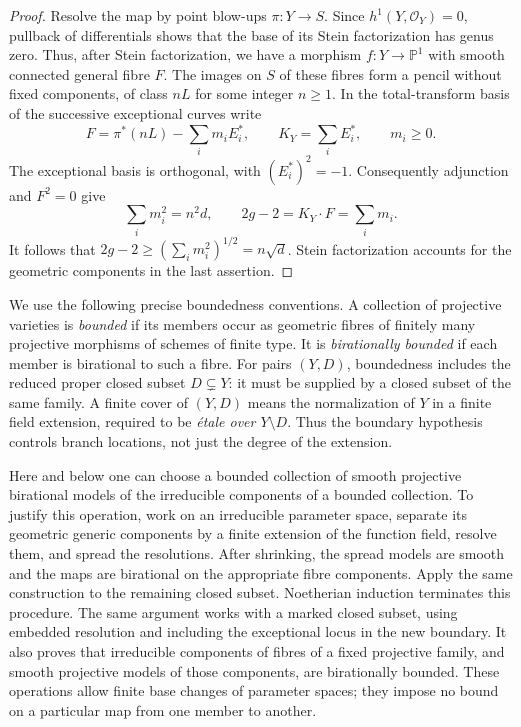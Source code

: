\begin{proof}
Resolve the map by point blow-ups $\pi:Y\to S$.  Since $h^1(Y,\mathcal
O_Y)=0$, pullback of differentials shows that the base of its Stein
factorization has genus zero.  Thus, after Stein factorization, we have
a morphism $f:Y\to\mathbb P^1$ with smooth connected general fibre $F$.
The images on $S$ of these fibres form a pencil without fixed components,
of class $nL$ for some integer $n\geq1$.  In the total-transform basis of
the successive exceptional curves write
\[
 F=\pi^*(nL)-\sum_i m_iE_i^*,\qquad
 K_Y=\sum_iE_i^*,\qquad m_i\geq0.
\]
The exceptional basis is orthogonal, with $(E_i^*)^2=-1$.  Consequently
adjunction and $F^2=0$ give
\[
       \sum_i m_i^2=n^2d,\qquad 2g-2=K_Y\cdot F=\sum_i m_i.
\]
It follows that $2g-2\geq(\sum_i m_i^2)^{1/2}=n\sqrt d$.
Stein factorization accounts for the geometric components in the last
assertion.
\end{proof}

We use the following precise boundedness conventions.  A collection of
projective varieties is \emph{bounded} if its members occur as geometric
fibres of finitely many projective morphisms of schemes of finite type.
It is \emph{birationally bounded} if each member is birational to such a
fibre.  For pairs $(Y,D)$, boundedness includes the reduced proper closed
subset $D\subsetneq Y$: it must be supplied by a closed subset of the
same family.  A finite cover of $(Y,D)$ means the normalization of $Y$
in a finite field extension, required to be \emph{\'etale over $Y\setminus
D$}.  Thus the boundary hypothesis controls branch locations, not just
the degree of the extension.

Here and below one can choose a bounded collection of smooth
projective birational models of the irreducible components of a bounded
collection.  To justify this
operation, work on an irreducible parameter space, separate its geometric
generic components by a finite extension of the function field, resolve
them, and spread the resolutions.  After shrinking, the spread models
are smooth and the maps are birational on the appropriate fibre
components.  Apply the same construction to the remaining closed subset.
Noetherian induction terminates this procedure.  The same argument works
with a marked closed subset, using embedded resolution and including the
exceptional locus in the new boundary.  It also proves that irreducible
components of fibres of a fixed projective family, and smooth projective
models of those components, are birationally bounded.  These operations
allow finite base changes of parameter spaces; they impose no bound on a
particular map from one member to another.

